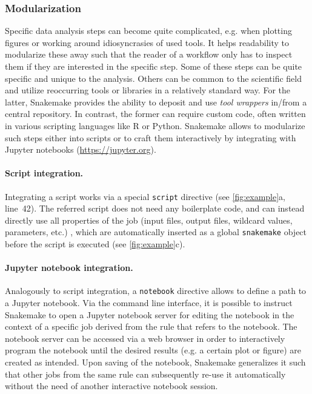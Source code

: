 \documentclass[parskip=half]{scrartcl}
\let\plainurl\url
\renewcommand{\url}[1]{\protect\plainurl{#1}}
\begin{document}
\subsubsection{Modularization}\label{sec:modularization}

Specific data analysis steps can become quite complicated, e.g. when plotting figures or working around idiosyncrasies of used tools.
It helps readability to modularize these away such that the reader of a workflow only has to inspect them if they are interested in the specific step.
Some of these steps can be quite specific and unique to the analysis.
Others can be common to the scientific field and utilize reoccurring tools or libraries in a relatively standard way.
For the latter, Snakemake provides the ability to deposit and use \emph{tool wrappers} in/from a central repository.
In contrast, the former can require custom code, often written in various scripting languages like R or Python.
Snakemake allows to modularize such steps either into scripts or to craft them interactively by integrating with Jupyter notebooks (\url{https://jupyter.org}).

\paragraph{Script integration.}
Integrating a script works via a special \lstinline!script! directive (see \autoref{fig:example}a, line~42).
The referred script does not need any boilerplate code, and can instead directly use all properties of the job (input files, output files, wildcard values, parameters, etc.)
, which are automatically inserted as a global \lstinline!snakemake! object before the script is executed (see \autoref{fig:example}c).

\paragraph{Jupyter notebook integration.}
Analogously to script integration, a \lstinline!notebook! directive allows to define a path to a Jupyter notebook.
Via the command line interface, it is possible to instruct Snakemake to open a Jupyter notebook server for editing the notebook in the context of a specific job derived from the rule that refers to the notebook.
The notebook server can be accessed via a web browser in order to interactively program the notebook until the desired results (e.g. a certain plot or figure) are created as intended.
Upon saving of the notebook, Snakemake generalizes it such that other jobs from the same rule can subsequently re-use it automatically without the need of another interactive notebook session.
\end{document}
